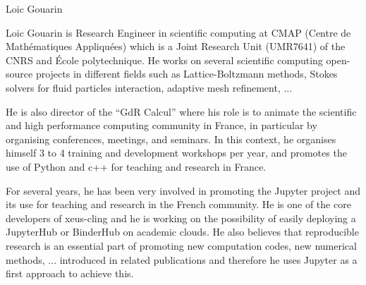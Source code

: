 \begin{participant}[type=leadPI,PM=8,gender=male]{Loic Gouarin}

  Loic Gouarin is Research Engineer in scientific computing at CMAP (Centre de
  Mathématiques Appliquées) which is a Joint Research Unit
  (UMR7641) of the CNRS and \'Ecole polytechnique. He works on several
  scientific computing open-source projects in different fields such as
  Lattice-Boltzmann methods, Stokes solvers for fluid particles interaction,
  adaptive mesh refinement, ...

  He is also director of the ``GdR Calcul'' where his role is to animate the
  scientific and high performance computing community in France, in particular
  by organising conferences, meetings, and seminars. In this context, he
  organises himself 3 to 4 training and development workshops per year, and
  promotes the use of Python and c++ for teaching and research in France.
  
  For several years, he has been very involved in promoting the Jupyter project
  and its use for teaching and research in the French community. He is one of
  the core developers of xeus-cling and he is working on the possibility of
  easily deploying a JupyterHub or BinderHub on academic clouds. He also
  believes that reproducible research is an essential part of promoting new
  computation codes, new numerical methods, ... introduced in related
  publications and therefore he uses Jupyter as a first approach to achieve this.
  
  \end{participant}
  
  